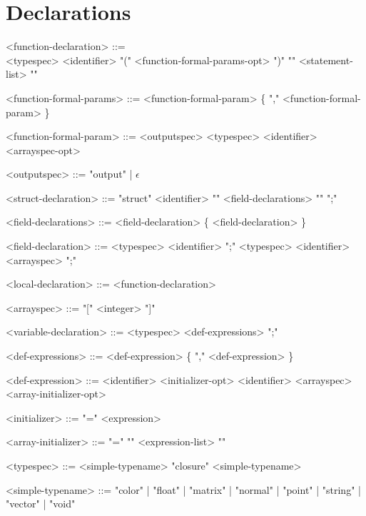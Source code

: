 \documentclass[11pt,letterpaper]{book}
\begin{document}
\section*{Declarations}
\begin{grammar}

<function-declaration> ::= \spc \\ <typespec> <identifier> 
      "(" <function-formal-params-opt> ")" "{" <statement-list> "}"

<function-formal-params> ::= <function-formal-param> \{ "," <function-formal-param> \}

<function-formal-param> ::= <outputspec> <typespec> <identifier> <arrayspec-opt>

<outputspec> ::= "output" | $\epsilon$

<struct-declaration> ::= "struct" <identifier> "{" <field-declarations> "}" ";"

<field-declarations> ::= <field-declaration> \{ <field-declaration> \}

<field-declaration> ::= <typespec> <identifier> ";"
\alt <typespec> <identifier> <arrayspec> ";"

<local-declaration> ::= <function-declaration>

<arrayspec> ::= "[" <integer> "]"

<variable-declaration> ::= <typespec> <def-expressions> ";"

<def-expressions> ::= <def-expression> \{ "," <def-expression> \}

<def-expression> ::= <identifier> <initializer-opt>
\alt <identifier> <arrayspec> <array-initializer-opt>

<initializer> ::= "=" <expression>

<array-initializer> ::= "=" "{" <expression-list> "}"

<typespec> ::= <simple-typename> 
\alt "closure" <simple-typename>

<simple-typename> ::= 
"color"
| "float"
| "matrix"
| "normal"
| "point"
| "string"
| "vector"
| "void"

\end{grammar}
\end{document}
